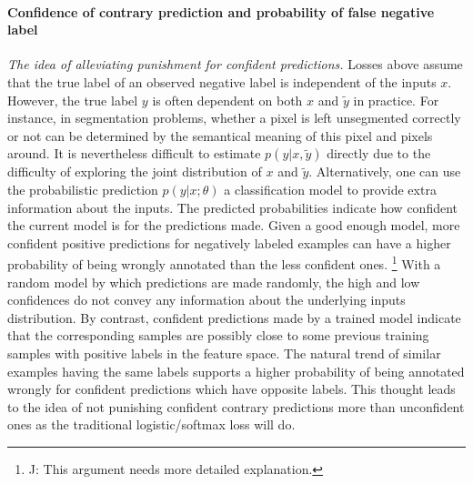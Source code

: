\paragraph{Confidence of contrary prediction and probability of false negative label}
\noindent
\noindent \textit{The idea of alleviating punishment for confident predictions.}
Losses above assume that the true label of an observed negative label is independent of the inputs $x$.
However, the true label $y$ is often dependent on both $x$ and $\tilde{y}$ in practice.
For instance, in segmentation problems, whether a pixel is left unsegmented correctly or not can be determined by the semantical meaning of this pixel and pixels around.
It is nevertheless difficult to estimate $p(y \vert x, \tilde{y})$ directly due to the difficulty of exploring the joint distribution of $x$ and $\tilde{y}$.
Alternatively, one can use the probabilistic prediction $p(y \vert x;\theta)$ a classification model to provide extra information about the inputs.
The predicted probabilities indicate how confident the current model is for the predictions made.
Given a good enough model, more confident positive predictions for negatively labeled examples can have a higher probability of being wrongly annotated than the less confident ones.
\footnote{J: This argument needs more detailed explanation.}
With a random model by which predictions are made randomly, the high and low confidences do not convey any information about the underlying inputs distribution.
By contrast, confident predictions made by a trained model indicate that the corresponding samples are possibly close to some previous training samples with positive labels in the feature space.
The natural trend of similar examples having the same labels supports a higher probability of being annotated wrongly for confident predictions which have opposite labels.
This thought leads to the idea of not punishing confident contrary predictions more than unconfident ones as the traditional logistic/softmax loss will do.

